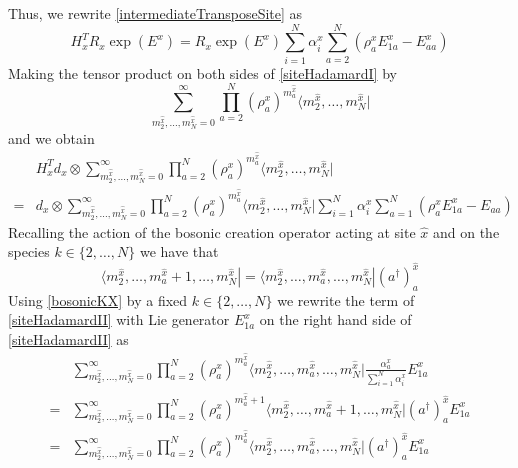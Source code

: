 \documentclass[11pt]{article}
\numberwithin{equation}{section}
\numberwithin{equation}{subsection}
\begin{document}
Thus, we rewrite \eqref{intermediateTransposeSite} as
\begin{equation}\label{siteHadamardI}
H_{x}^{T}R_{x}\exp{(E^{x})}=R_{x}\exp{(E^{x})}\sum_{i=1}^{N}\alpha_{i}^{x}\sum_{a=2}^{N}\left(\rho_{a}^{x}E_{1a}^{x}-E_{aa}^{x}\right)
\end{equation}
Making the tensor product on both sides of \eqref{siteHadamardI} by 
\begin{equation}
\sum_{m_{2}^{\widehat{x}},\ldots,m_{N}^{\widehat{x}}=0}^{\infty}\prod_{a=2}^{N}\left(\rho_{a}^{x}\right)^{m_{a}^{\widehat{x}}}\langle m_{2}^{\widehat{x}},\ldots,m_{N}^{\widehat{x}}|
\end{equation}
and we obtain 
\begin{equation}\label{siteHadamardII}
    \begin{split}
&H_{x}^{T}d_{x}\otimes\sum_{m_{2}^{\widehat{x}},\ldots,m_{N}^{\widehat{x}}=0}^{\infty}\prod_{a=2}^{N}\left(\rho_{a}^{x}\right)^{m_{a}^{\widehat{x}}}\langle m_{2}^{\widehat{x}},\ldots,m_{N}^{\widehat{x}}|
\\=&
d_{x}\otimes \sum_{m_{2}^{\widehat{x}},\ldots,m_{N}^{\widehat{x}}=0}^{\infty}\prod_{a=2}^{N}\left(\rho_{a}^{x}\right)^{m_{a}^{\widehat{x}}}\langle m_{2}^{\widehat{x}},\ldots,m_{N}^{\widehat{x}}|\sum_{i=1}^{N}\alpha_{i}^{x}\sum_{a=1}^{N}\left(\rho_{a}^{x}E_{1a}^{x}-E_{aa}\right)
    \end{split}
\end{equation}
Recalling the action of the bosonic creation operator acting at site $\widehat{x}$ and on the species $k\in \{2,\ldots,N\}$ we have that 
\begin{equation}\label{bosonicKX}
    \langle m_{2}^{\widehat{x}},\ldots,m_{a}^{\widehat{x}}+1,\ldots,m_{N}^{\widehat{x}}|=  \langle m_{2}^{\widehat{x}},\ldots,m_{a}^{\widehat{x}},\ldots,m_{N}^{\widehat{x}}|(a^{\dagger})^{\widehat{x}}_{a}
\end{equation}
Using \eqref{bosonicKX} by a fixed $k\in \{2,\ldots,N\}$ we rewrite the term of \eqref{siteHadamardII} with Lie generator $E_{1a}^{x}$ on the right hand side of \eqref{siteHadamardII} as 
\begin{equation}
    \begin{split}
&\sum_{m_{2}^{\widehat{x}},\ldots,m_{N}^{\widehat{x}}=0}^{\infty}\prod_{a=2}^{N}\left(\rho_{a}^{x}\right)^{m_{a}^{\widehat{x}}}\langle m_{2}^{\widehat{x}},\ldots,m_{a}^{\widehat{x}},\ldots,m_{N}^{\widehat{x}}|\frac{\alpha_{a}^{x}}{\sum_{i=1}^{N}\alpha_{i}^{x}}E_{1a}^{x}
\\=&\sum_{m_{2}^{\widehat{x}},\ldots,m_{N}^{\widehat{x}}=0}^{\infty}\prod_{a=2}^{N}\left(\rho_{a}^{x}\right)^{m_{a}^{\widehat{x}}+1}\langle m_{2}^{\widehat{x}},\ldots,m_{a}^{\widehat{x}}+1,\ldots,m_{N}^{\widehat{x}}|(a^{\dagger})_{a}^{\widehat{x}}E_{1a}^{x}
\\=&
\sum_{m_{2}^{\widehat{x}},\ldots,m_{N}^{\widehat{x}}=0}^{\infty}\prod_{a=2}^{N}\left(\rho_{a}^{x}\right)^{m_{a}^{\widehat{x}}}\langle m_{2}^{\widehat{x}},\ldots,m_{a}^{\widehat{x}},\ldots,m_{N}^{\widehat{x}}|(a^{\dagger})_{a}^{\widehat{x}}E_{1a}^{x}
    \end{split}
\end{equation}
\end{document}
